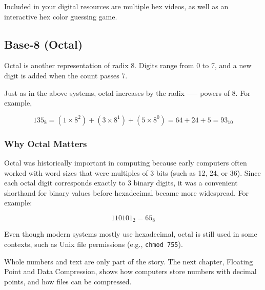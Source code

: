 Included in your digital resources are multiple hex videos, as well as an interactive hex color guessing game.

\subsection{Base-8 (Octal)}
Octal is another representation of radix 8. Digits range from 0 to 7, and a new digit is added when the count passes 7.

Just as in the above systems, octal increases by the radix —-- powers of 8. For example,

$$
135_{8} = (1 \times 8^2) + (3\times 8^1) + (5\times 8^0) = 64 + 24 + 5 = 93_{10}
$$

\subsubsection{Why Octal Matters}
Octal was historically important in computing because early computers often worked with word sizes that were multiples of 3 bits (such as 12, 24, or 36). Since each octal digit corresponds exactly to 3 binary digits, it was a convenient shorthand for binary values before hexadecimal became more widespread. For example:

$$
110101_2 = 65_8
$$

Even though modern systems mostly use hexadecimal, octal is still used in some contexts, such as Unix file permissions (e.g., \texttt{chmod 755}).

Whole numbers and text are only part of the story. The next chapter, Floating Point and Data Compression,
shows how computers store numbers with decimal points, and how files can be compressed.
